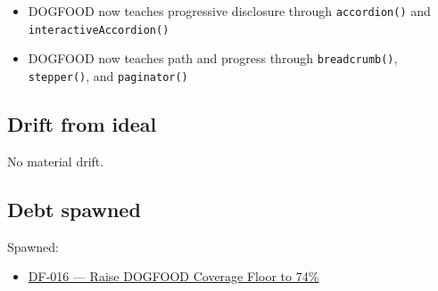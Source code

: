 \begin{itemize}
\tightlist
\item
  DOGFOOD now teaches progressive disclosure through \texttt{a\allowbreak{}c\allowbreak{}c\allowbreak{}o\allowbreak{}r\allowbreak{}d\allowbreak{}i\allowbreak{}o\allowbreak{}n\allowbreak{}(\allowbreak{})} and \texttt{i\allowbreak{}n\allowbreak{}t\allowbreak{}e\allowbreak{}r\allowbreak{}a\allowbreak{}c\allowbreak{}t\allowbreak{}i\allowbreak{}v\allowbreak{}e\allowbreak{}A\allowbreak{}c\allowbreak{}c\allowbreak{}o\allowbreak{}r\allowbreak{}d\allowbreak{}i\allowbreak{}o\allowbreak{}n\allowbreak{}(\allowbreak{})}
\item
  DOGFOOD now teaches path and progress through \texttt{b\allowbreak{}r\allowbreak{}e\allowbreak{}a\allowbreak{}d\allowbreak{}c\allowbreak{}r\allowbreak{}u\allowbreak{}m\allowbreak{}b\allowbreak{}(\allowbreak{})}, \texttt{s\allowbreak{}t\allowbreak{}e\allowbreak{}p\allowbreak{}p\allowbreak{}e\allowbreak{}r\allowbreak{}(\allowbreak{})}, and \texttt{p\allowbreak{}a\allowbreak{}g\allowbreak{}i\allowbreak{}n\allowbreak{}a\allowbreak{}t\allowbreak{}o\allowbreak{}r\allowbreak{}(\allowbreak{})}
\end{itemize}

\subsection{Drift from ideal}\label{record-077-drift-from-ideal}

No material drift.

\subsection{Debt spawned}\label{record-077-debt-spawned}

Spawned:

\begin{itemize}
\tightlist
\item
  \href{https://github.com/flyingrobots/bijou/blob/cbd70612140e7a450d764b3c7be1c6af878b99bc/docs/design/DF-016-raise-dogfood-coverage-floor-to-74-percent.md}{DF-016 --- Raise DOGFOOD Coverage Floor to 74\%}
\end{itemize}

